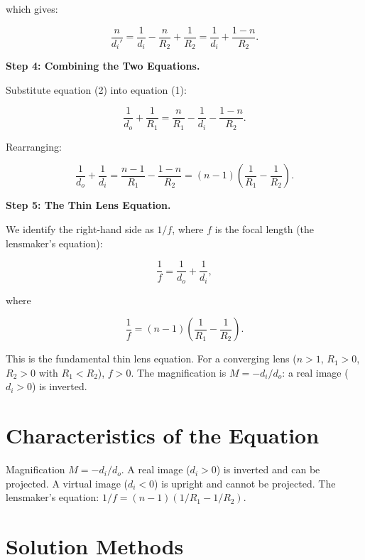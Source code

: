 which gives:

\begin{equation}
\frac{n}{d_i'} = \frac{1}{d_i} - \frac{n}{R_2} + \frac{1}{R_2} = \frac{1}{d_i} + \frac{1-n}{R_2}. \tag{2}
\end{equation}

\textbf{Step 4: Combining the Two Equations.}

Substitute equation (2) into equation (1):

\begin{equation}
\frac{1}{d_o} + \frac{1}{R_1} = \frac{n}{R_1} - \frac{1}{d_i} - \frac{1-n}{R_2}.
\end{equation}

Rearranging:

\begin{equation}
\frac{1}{d_o} + \frac{1}{d_i} = \frac{n-1}{R_1} - \frac{1-n}{R_2} = (n-1)\left(\frac{1}{R_1} - \frac{1}{R_2}\right).
\end{equation}

\textbf{Step 5: The Thin Lens Equation.}

We identify the right-hand side as $1/f$, where $f$ is the focal length (the lensmaker's equation):

\begin{equation}
\boxed{\frac{1}{f} = \frac{1}{d_o} + \frac{1}{d_i},}
\end{equation}

where

\begin{equation}
\frac{1}{f} = (n-1)\left(\frac{1}{R_1} - \frac{1}{R_2}\right).
\end{equation}

This is the fundamental thin lens equation. For a converging lens ($n > 1$, $R_1 > 0$, $R_2 > 0$ with $R_1 < R_2$), $f > 0$. The magnification is $M = -d_i/d_o$: a real image ($d_i > 0$) is inverted.

\section*{Characteristics of the Equation}

Magnification $M = -d_i/d_o$. A real image ($d_i > 0$) is inverted and can be projected. A virtual image ($d_i < 0$) is upright and cannot be projected. The lensmaker's equation: $1/f = (n-1)(1/R_1 - 1/R_2)$.
\section*{Solution Methods}

